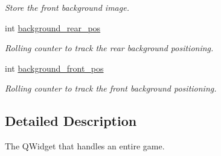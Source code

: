 \begin{DoxyCompactItemize}
\begin{DoxyCompactList}\small\item\em Store the front background image. \end{DoxyCompactList}\item 
\hypertarget{classGameWidget_afd2d792914fd4360aa7baa885113aac9}{
int \hyperlink{classGameWidget_afd2d792914fd4360aa7baa885113aac9}{background\_\-rear\_\-pos}}
\label{classGameWidget_afd2d792914fd4360aa7baa885113aac9}

\begin{DoxyCompactList}\small\item\em Rolling counter to track the rear background positioning. \end{DoxyCompactList}\item 
\hypertarget{classGameWidget_a6dca94e63accd67c70262c5c39828062}{
int \hyperlink{classGameWidget_a6dca94e63accd67c70262c5c39828062}{background\_\-front\_\-pos}}
\label{classGameWidget_a6dca94e63accd67c70262c5c39828062}

\begin{DoxyCompactList}\small\item\em Rolling counter to track the front background positioning. \end{DoxyCompactList}\end{DoxyCompactItemize}


\subsection{Detailed Description}
The QWidget that handles an entire game. 

